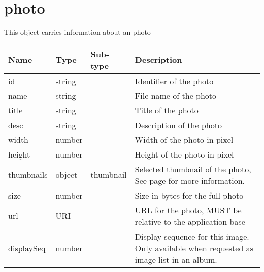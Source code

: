 \documentclass[a4paper,12pt]{report}
\newcommand{\see}[1]{See page \pageref{#1} for more information.}
\begin{document}
	\section{photo}\label{obj:photo}
	This object carries information about an photo
	
	\begin{tabular}{|l|l|l|p{10cm}|}
		\hline
		Name & Type & Sub-type & Description\\\hline
		id & string & & Identifier of the photo\\\hline
		name & string & & File name of the photo\\\hline
		title & string & & Title of the photo\\\hline
		desc & string & & Description of the photo \\\hline
		width & number & & Width of the photo in pixel\\\hline
		height & number & & Height of the photo in pixel\\\hline
		thumbnails & object & thumbnail & Selected thumbnail of the photo, \see{obj:thumbnail}\\\hline
		size & number & & Size in bytes for the full photo\\\hline
		url & URI & & URL for the photo, MUST be relative to the application base\\\hline
		displaySeq  & number & & Display sequence for this image. Only available when requested as image list in an album.\\\hline
	\end{tabular}
\end{document}
